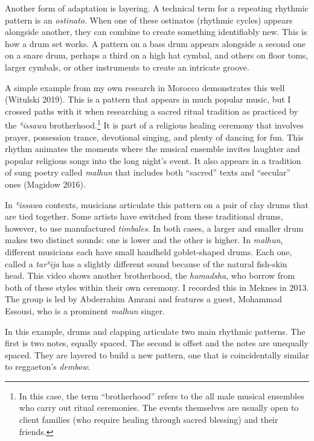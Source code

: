 \documentclass[twoside]{article}
\begin{document}
Another form of adaptation is layering. A technical term for a repeating
rhythmic pattern is an \emph{ostinato}. When one of these ostinatos
(rhythmic cycles) appears alongside another, they can combine to create
something identifiably new. This is how a drum set works. A pattern on a
bass drum appears alongside a second one on a snare drum, perhaps a
third on a high hat cymbal, and others on floor toms, larger cymbals, or
other instruments to create an intricate groove.

A simple example from my own research in Morocco demonstrates this well
(Witulski 2019). This is a pattern that appears in much popular music,
but I crossed paths with it when researching a sacred ritual tradition
as practiced by the \emph{ʿissawa} brotherhood.\footnote{In this case,
  the term ``brotherhood'' refers to the all male musical ensembles who
  carry out ritual ceremonies. The events themselves are usually open to
  client families (who require healing through sacred blessing) and
  their friends.} It is part of a religious healing ceremony that
involves prayer, possession trance, devotional singing, and plenty of
dancing for fun. This rhythm animates the moments where the musical
ensemble invites laughter and popular religious songs into the long
night's event. It also appears in a tradition of sung poetry called
\emph{malhun} that includes both ``sacred'' texts and ``secular'' ones
(Magidow 2016).

In \emph{ʿissawa} contexts, musicians articulate this pattern on a pair
of clay drums that are tied together. Some artists have switched from
these traditional drums, however, to use manufactured \emph{timbales}.
In both cases, a larger and smaller drum makes two distinct sounds: one
is lower and the other is higher. In \emph{malhun}, different musicians
each have small handheld goblet-shaped drums. Each one, called a
\emph{tarʿija} has a slightly different sound because of the natural
fish-skin head. This video shows another brotherhood, the
\emph{hamadsha}, who borrow from both of these styles within their own
ceremony. I recorded this in Meknes in 2013. The group is led by
Abderrahim Amrani and features a guest, Mohammad Essousi, who is a
prominent \emph{malhun} singer.

In this example, drums and clapping articulate two main rhythmic
patterns. The first is two notes, equally spaced. The second is offset
and the notes are unequally spaced. They are layered to build a new
pattern, one that is coincidentally similar to reggaeton's
\emph{dembow}.
\end{document}
